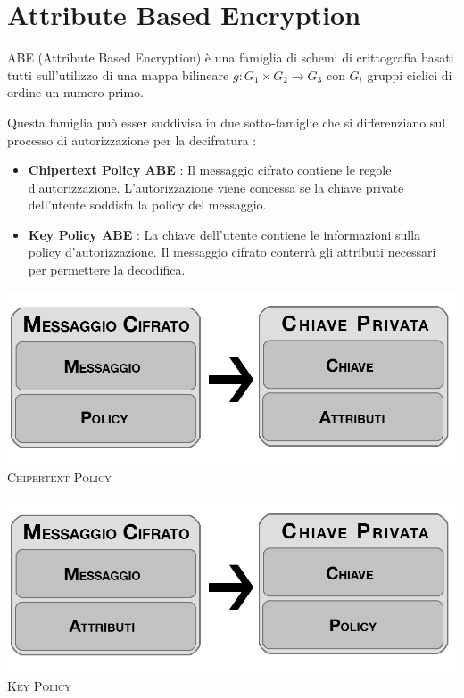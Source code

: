 \chapter{Attribute Based Encryption}

ABE (Attribute Based Encryption) è una famiglia di schemi di crittografia basati tutti sull'utilizzo di una mappa bilineare $g:G_1 \times G_2 \rightarrow G_3$ con $G_i$ gruppi ciclici di ordine un numero primo.

Questa famiglia può esser suddivisa in due sotto-famiglie che si differenziano sul processo di autorizzazione per la decifratura :
\begin{itemize}
	\item \textbf{{Chipertext Policy ABE}} :  Il messaggio cifrato contiene le regole d'autorizzazione. L'autorizzazione viene concessa se la chiave private dell'utente soddisfa la policy del messaggio.
	\item \textbf{Key Policy ABE} : La chiave dell'utente contiene le informazioni sulla policy d'autorizzazione. Il messaggio cifrato conterrà gli attributi necessari per permettere la decodifica.
\end{itemize}

\begin{minipage}[c]{0.9\textwidth}
\vspace{0,3cm}
\centering
	\begin{minipage}[c]{0.45\textwidth}
		\centering
		\includegraphics[keepaspectratio,width=\textwidth]{CT.jpg}\\
		{\small\scshape Chipertext Policy}
	\end{minipage}
	\hfill
	\begin{minipage}[c]{0.45\textwidth}
		\centering
		\includegraphics[keepaspectratio,width=\textwidth]{KP.jpg}\\
		{\small\scshape Key Policy}
	\end{minipage}
\vspace{0,8cm}
\end{minipage}

